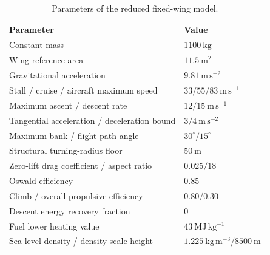\documentclass[preprint,12pt]{elsarticle}
\begin{document}
\begin{table}[t]
 \centering
 \caption{Parameters of the reduced fixed-wing model.}
 \label{tab:aircraft}
 \small
 \begin{tabular}{ll}
 \hline
 Parameter & Value \\
 \hline
 Constant mass & $1100~\mathrm{kg}$ \\
 Wing reference area & $11.5~\mathrm{m^2}$ \\
 Gravitational acceleration & $9.81~\mathrm{m\,s^{-2}}$ \\
 Stall / cruise / aircraft maximum speed & $33 / 55 / 83~\mathrm{m\,s^{-1}}$ \\
 Maximum ascent / descent rate & $12 / 15~\mathrm{m\,s^{-1}}$ \\
 Tangential acceleration / deceleration bound & $3 / 4~\mathrm{m\,s^{-2}}$ \\
 Maximum bank / flight-path angle & $30^\circ / 15^\circ$ \\
 Structural turning-radius floor & $50~\mathrm{m}$ \\
 Zero-lift drag coefficient / aspect ratio & $0.025 / 18$ \\
 Oswald efficiency & $0.85$ \\
 Climb / overall propulsive efficiency & $0.80 / 0.30$ \\
 Descent energy recovery fraction & $0$ \\
 Fuel lower heating value & $43~\mathrm{MJ\,kg^{-1}}$ \\
 Sea-level density / density scale height & $1.225~\mathrm{kg\,m^{-3}} / 8500~\mathrm{m}$ \\
 \hline
 \end{tabular}
\end{table}
\end{document}
